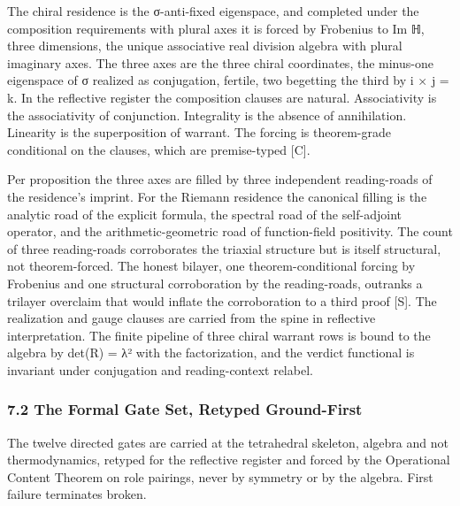 \documentclass[10pt,twocolumn]{article}
\begin{document}
The chiral residence is the σ-anti-fixed eigenspace, and completed under
the composition requirements with plural axes it is forced by Frobenius
to Im ℍ, three dimensions, the unique associative real division algebra
with plural imaginary axes. The three axes are the three chiral
coordinates, the minus-one eigenspace of σ realized as conjugation,
fertile, two begetting the third by i × j = k. In the reflective
register the composition clauses are natural. Associativity is the
associativity of conjunction. Integrality is the absence of
annihilation. Linearity is the superposition of warrant. The forcing is
theorem-grade conditional on the clauses, which are premise-typed
{[}C{]}.

Per proposition the three axes are filled by three independent
reading-roads of the residence's imprint. For the Riemann residence the
canonical filling is the analytic road of the explicit formula, the
spectral road of the self-adjoint operator, and the arithmetic-geometric
road of function-field positivity. The count of three reading-roads
corroborates the triaxial structure but is itself structural, not
theorem-forced. The honest bilayer, one theorem-conditional forcing by
Frobenius and one structural corroboration by the reading-roads,
outranks a trilayer overclaim that would inflate the corroboration to a
third proof {[}S{]}. The realization and gauge clauses are carried from
the spine in reflective interpretation. The finite pipeline of three
chiral warrant rows is bound to the algebra by det(R) = λ² with the
factorization, and the verdict functional is invariant under conjugation
and reading-context relabel.

\hypertarget{the-formal-gate-set-retyped-ground-first}{%
\subsubsection{7.2 The Formal Gate Set, Retyped
Ground-First}\label{the-formal-gate-set-retyped-ground-first}}

The twelve directed gates are carried at the tetrahedral skeleton,
algebra and not thermodynamics, retyped for the reflective register and
forced by the Operational Content Theorem on role pairings, never by
symmetry or by the algebra. First failure terminates broken.
\end{document}
